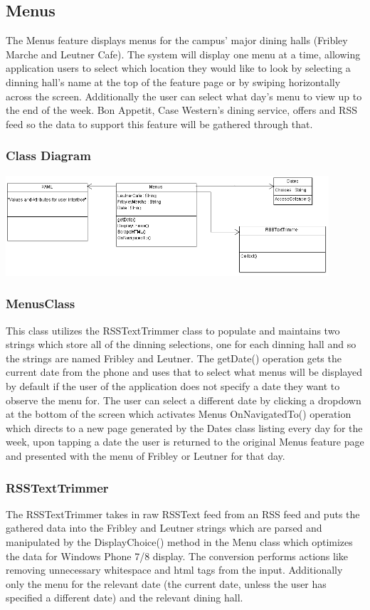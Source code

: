 \documentclass[pdftex,12pt,letter]{article}
\begin{document}
\subsection{Menus}
The Menus feature displays menus for the campus' major dining halls (Fribley Marche and Leutner Cafe). The system will display one menu at a time, allowing application users to select which location they would like to look by selecting a dinning hall's name at the top of the feature page or by swiping horizontally across the screen. Additionally the user can select what day's menu to view up to the end of the week. Bon Appetit, Case Western's dining service, offers and RSS feed so the data to support this feature will be gathered through that.
\subsubsection{Class Diagram}
\begin{flushleft}
\includegraphics[width=120mm]{MenuCD.png}
\end{flushleft}
\subsubsection{MenusClass}
This class utilizes the RSSTextTrimmer class to populate and maintains two strings which store all of the dinning selections, one for each dinning hall and so the strings are named Fribley and Leutner. The getDate() operation gets the current date from the phone and uses that to select what menus will be displayed by default if the user of the application does not specify a date they want to observe the menu for. The user can select a different date by clicking a dropdown at the bottom of the screen which activates Menus OnNavigatedTo() operation which directs to a new page generated by the Dates class listing every day for the week, upon tapping a date the user is returned to the original Menus feature page and presented with the menu of Fribley or Leutner for that day.
\subsubsection{RSSTextTrimmer}
The RSSTextTrimmer takes in raw RSSText feed from an RSS feed and
puts the gathered data into the Fribley and Leutner strings which are parsed and manipulated by the DisplayChoice() method in the Menu class which optimizes the data for Windows Phone 7/8 display. The conversion performs actions like removing
unnecessary whitespace and html tags from the input. Additionally only the menu for the relevant date (the current date, unless the user has specified a different date) and the relevant dining hall.
\end{document}
